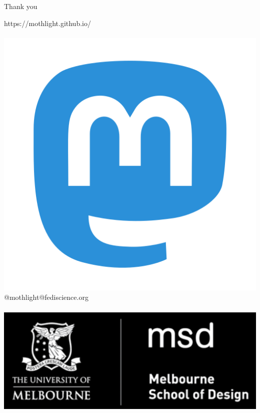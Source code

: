 \documentclass{beamer}
\begin{document}
\begin{frame}{Thank you}
\begin{center}
https://mothlight.github.io/
\\
~
\\
\includegraphics[scale=0.02,trim = 0mm 0mm 0mm 0mm, clip]{207_Mastodon_logo_logos-512.png} @mothlight@fediscience.org
\\
~
\\
\includegraphics[scale=0.75,trim = 0mm 0mm 0mm 0mm, clip]{Logo2.png}
\end{center} 
\end{frame}
\end{document}
